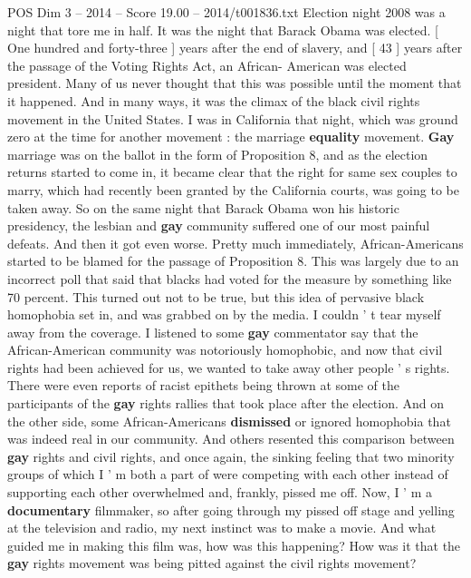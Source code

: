 \begin{textsample}{POS Dim 3 – 2014 – Score 19.00 – 2014/t001836.txt}  \label{ex:f3_pos_035}
Election night 2008 was a night that tore me in half.
It was the night that Barack Obama was elected. [ One hundred and forty-three ] years after the end of slavery, and [ 43 ] years after the passage of the Voting Rights Act, an African- American was elected president.
Many of us never thought that this was possible until the moment that it happened.
And in many ways, it was the climax of the black civil rights movement in the United States.
I was in California that night, which was ground zero at the time for another movement : the marriage \textbf{equality} movement. \textbf{Gay} marriage was on the ballot in the form of Proposition 8, and as the election returns started to come in, it became clear that the right for same sex couples to marry, which had recently been granted by the California courts, was going to be taken away.
So on the same night that Barack Obama won his historic presidency, the lesbian and \textbf{gay} community suffered one of our most painful defeats.
And then it got even worse.
Pretty much immediately, African-Americans started to be blamed for the passage of Proposition 8.
This was largely due to an incorrect poll that said that blacks had voted for the measure by something like 70 percent.
This turned out not to be true, but this idea of pervasive black homophobia set in, and was grabbed on by the media.
I couldn ' t tear myself away from the coverage.
I listened to some \textbf{gay} commentator say that the African-American community was notoriously homophobic, and now that civil rights had been achieved for us, we wanted to take away other people ' s rights.
There were even reports of racist epithets being thrown at some of the participants of the \textbf{gay} rights rallies that took place after the election.
And on the other side, some African-Americans \textbf{dismissed} or ignored homophobia that was indeed real in our community.
And others resented this comparison between \textbf{gay} rights and civil rights, and once again, the sinking feeling that two minority groups of which I ' m both a part of were competing with each other instead of supporting each other overwhelmed and, frankly, pissed me off.
Now, I ' m a \textbf{documentary} filmmaker, so after going through my pissed off stage and yelling at the television and radio, my next instinct was to make a movie.
And what guided me in making this film was, how was this happening?
How was it that the \textbf{gay} rights movement was being pitted against the civil rights movement?

\end{textsample}
